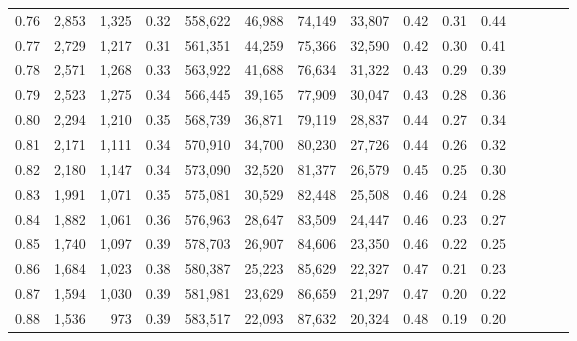 \begin{tabular}{rrrcrrrrrrrrrrr}
0.76 &   2,853 &   1,325 &                                       0.32 &  558,622 &   46,988 &   74,149 &   33,807 &  0.42 &  0.31 &                         0.44 \\
0.77 &   2,729 &   1,217 &                                       0.31 &  561,351 &   44,259 &   75,366 &   32,590 &  0.42 &  0.30 &                         0.41 \\
0.78 &   2,571 &   1,268 &                                       0.33 &  563,922 &   41,688 &   76,634 &   31,322 &  0.43 &  0.29 &                         0.39 \\
0.79 &   2,523 &   1,275 &                                       0.34 &  566,445 &   39,165 &   77,909 &   30,047 &  0.43 &  0.28 &                         0.36 \\
0.80 &   2,294 &   1,210 &                                       0.35 &  568,739 &   36,871 &   79,119 &   28,837 &  0.44 &  0.27 &                         0.34 \\
0.81 &   2,171 &   1,111 &                                       0.34 &  570,910 &   34,700 &   80,230 &   27,726 &  0.44 &  0.26 &                         0.32 \\
0.82 &   2,180 &   1,147 &                                       0.34 &  573,090 &   32,520 &   81,377 &   26,579 &  0.45 &  0.25 &                         0.30 \\
0.83 &   1,991 &   1,071 &                                       0.35 &  575,081 &   30,529 &   82,448 &   25,508 &  0.46 &  0.24 &                         0.28 \\
0.84 &   1,882 &   1,061 &                                       0.36 &  576,963 &   28,647 &   83,509 &   24,447 &  0.46 &  0.23 &                         0.27 \\
0.85 &   1,740 &   1,097 &                                       0.39 &  578,703 &   26,907 &   84,606 &   23,350 &  0.46 &  0.22 &                         0.25 \\
0.86 &   1,684 &   1,023 &                                       0.38 &  580,387 &   25,223 &   85,629 &   22,327 &  0.47 &  0.21 &                         0.23 \\
0.87 &   1,594 &   1,030 &                                       0.39 &  581,981 &   23,629 &   86,659 &   21,297 &  0.47 &  0.20 &                         0.22 \\
0.88 &   1,536 &     973 &                                       0.39 &  583,517 &   22,093 &   87,632 &   20,324 &  0.48 &  0.19 &                         0.20 \\

\end{tabular}
